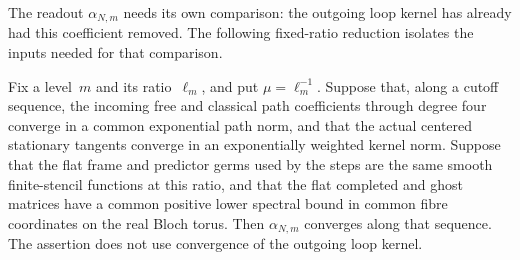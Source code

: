 The readout $\alpha_{N,m}$ needs its own comparison: the outgoing loop kernel has already had this coefficient removed. The following fixed-ratio reduction isolates the inputs needed for that comparison.
\begin{lemma}\label{lem:D-readout-comparison}
Fix a level~$m$ and its ratio~$\ell_m$, and put $\mu=\ell_m^{-1}$. Suppose that, along a cutoff sequence, the incoming free and classical path coefficients through degree four converge in a common exponential path norm, and that the actual centered stationary tangents converge in an exponentially weighted kernel norm. Suppose that the flat frame and predictor germs used by the steps are the same smooth finite-stencil functions at this ratio, and that the flat completed and ghost matrices have a common positive lower spectral bound in common fibre coordinates on the real Bloch torus. Then $\alpha_{N,m}$ converges along that sequence. The assertion does not use convergence of the outgoing loop kernel.
\end{lemma}
